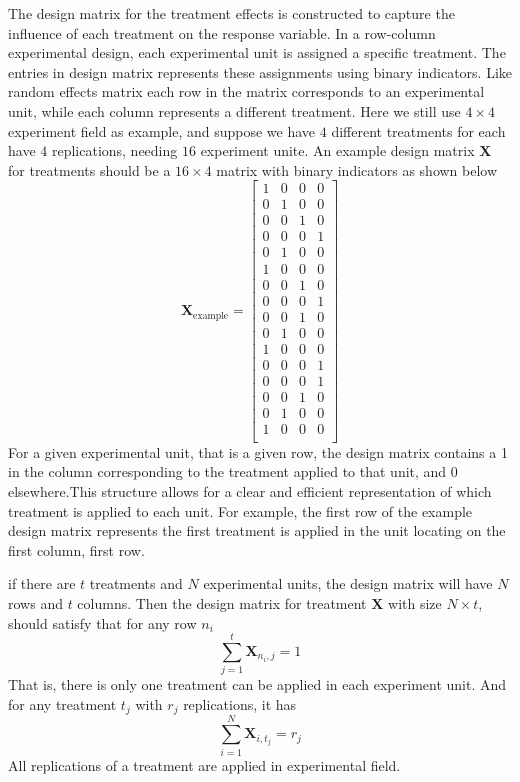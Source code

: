 \documentclass[
  a4paper,
  oneside,
  openany,
  12pt,
  onecolumn]{book}
\theoremstyle{definition}
\theoremstyle{definition}
\theoremstyle{plain}
\theoremstyle{remark}
\begin{document}
The design matrix for the treatment effects is constructed to capture
the influence of each treatment on the response variable. In a
row-column experimental design, each experimental unit is assigned a
specific treatment. The entries in design matrix represents these
assignments using binary indicators. Like random effects matrix each row
in the matrix corresponds to an experimental unit, while each column
represents a different treatment. Here we still use \(4\times 4\)
experiment field as example, and suppose we have \(4\) different
treatments for each have \(4\) replications, needing \(16\) experiment
unite. An example design matrix \(\boldsymbol{X}\) for treatments should
be a \(16\times 4\) matrix with binary indicators as shown below \[
\boldsymbol{X}_{\text{example}}=
\begin{bmatrix}
1 & 0 & 0 & 0\\
0 & 1 & 0 & 0\\
0 & 0 & 1 & 0\\
0 & 0 & 0 & 1\\
0 & 1 & 0 & 0\\
1 & 0 & 0 & 0\\
0 & 0 & 1 & 0\\
0 & 0 & 0 & 1\\
0 & 0 & 1 & 0\\
0 & 1 & 0 & 0\\
1 & 0 & 0 & 0\\
0 & 0 & 0 & 1\\
0 & 0 & 0 & 1\\
0 & 0 & 1 & 0\\
0 & 1 & 0 & 0\\
1 & 0 & 0 & 0\\
\end{bmatrix}
\] For a given experimental unit, that is a given row, the design matrix
contains a 1 in the column corresponding to the treatment applied to
that unit, and 0 elsewhere.This structure allows for a clear and
efficient representation of which treatment is applied to each unit. For
example, the first row of the example design matrix represents the first
treatment is applied in the unit locating on the first column, first
row.

if there are \(t\) treatments and \(N\) experimental units, the design
matrix will have \(N\) rows and \(t\) columns. Then the design matrix
for treatment \(\boldsymbol{X}\) with size \(N\times t\), should satisfy
that for any row \(n_{i}\) \[
\sum_{j=1}^{t} \boldsymbol{X}_{n_{i},j}=1
\] That is, there is only one treatment can be applied in each
experiment unit. And for any treatment \(t_j\) with \(r_j\)
replications, it has \[
\sum_{i=1}^{N}\boldsymbol{X}_{i,t_j}=r_j
\] All replications of a treatment are applied in experimental field.
\end{document}
